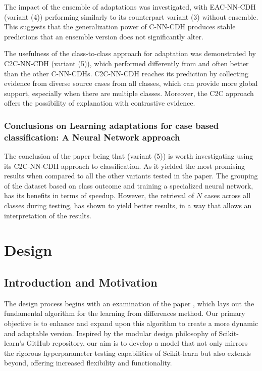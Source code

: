 \documentclass[a4paper, 12pt]{report}
\begin{document}
The impact of the ensemble of adaptations was investigated, with EAC-NN-CDH (variant (4)) performing similarly to its counterpart variant (3) without ensemble.
This suggests that the generalization power of C-NN-CDH produces stable predictions that an ensemble version does not significantly alter.

The usefulness of the class-to-class approach for adaptation was demonstrated by C2C-NN-CDH (variant (5)), which performed differently from and often better than the other C-NN-CDHs.
C2C-NN-CDH reaches its prediction by collecting evidence from diverse source cases from all classes,
which can provide more global support, especially when there are multiple classes. Moreover,
the C2C approach offers the possibility of explanation with contrastive evidence.

\subsection{Conclusions on Learning adaptations for case based classification: A Neural Network approach}
The conclusion of the paper \cite{ye2021learning} being that (variant (5)) is worth investigating using its C2C-NN-CDH approach to classification.
As it yielded the most promising results when compared to all the other variants tested in the paper. The grouping of the dataset based on class outcome and training a specialized neural network,
has its benefits in terms of speedup. However, the retrieval of $N$ cases across all classes during testing, has shown to yield better results, in a way that allows an interpretation of the results.

\chapter{Design}
\label{ch:Design}

\section{Introduction and Motivation}
The design process begins with an examination of the paper \cite{learningFromDifferences2022}, which lays out the fundamental algorithm for the learning from differences method. 
Our primary objective is to enhance and expand upon this algorithm to create a more dynamic and adaptable version. 
Inspired by the modular design philosophy of Scikit-learn's GitHub repository, our aim is to develop a model that not only mirrors the rigorous hyperparameter testing capabilities of Scikit-learn but also extends beyond, 
offering increased flexibility and functionality.
\end{document}
